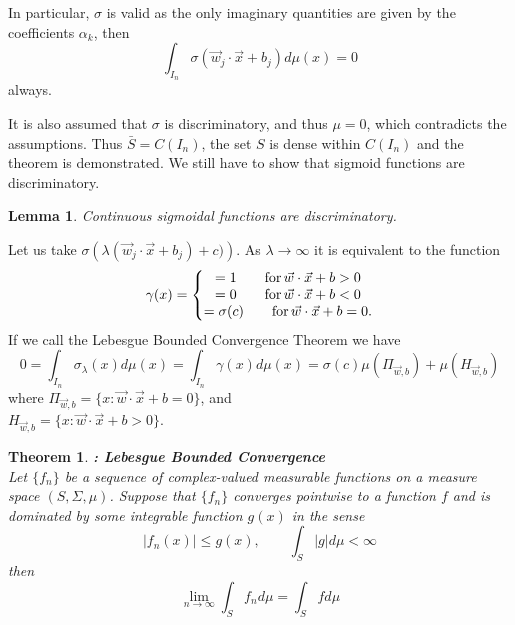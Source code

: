 \documentclass[aps,amssymb,amsmath,amsfonts,pra,superscriptaddress,twocolumn]{revtex4}
\newtheorem{theorem}{Theorem}
\newtheorem{lemma}{Lemma}
\begin{document}
In particular, $\sigma$ is valid as the only imaginary quantities are given by the coefficients $\alpha_k$, then
\begin{equation}
\int_{I_n} \sigma(\vec w_j \cdot \vec x + b_j) d\mu(x) = 0
\end{equation}
always. 

It is also assumed that $\sigma$ is discriminatory, and thus $\mu=0$, which contradicts the assumptions. Thus $\bar S = C(I_n)$, the set $S$ is dense within $C(I_n)$ and the theorem is demonstrated. We still have to show that sigmoid functions are discriminatory.

\begin{lemma}
Continuous sigmoidal functions are discriminatory.
\end{lemma}
Let us take $\sigma\left(\lambda(\vec w_j \cdot \vec x + b_j) + c)\right)$. As $\lambda \rightarrow \infty$ it is equivalent to the function
\begin{equation}
\gamma(x) = \left\lbrace \begin{matrix}
= 1 \qquad {\rm for \,} \vec w \cdot \vec x + b > 0 \\
= 0 \qquad {\rm for \,} \vec w \cdot \vec x + b < 0 \\
= \sigma(c) \qquad {\rm for \,} \vec w \cdot \vec x + b = 0. 
\end{matrix}\right.
\end{equation}
If we call the Lebesgue Bounded Convergence Theorem we have
\begin{equation}
0 = \int_{I_n} \sigma_\lambda(x) d\mu(x) = \int_{I_n} \gamma(x) d\mu(x) = \sigma(c) \mu(\Pi_{\vec w, b}) + \mu(H_{\vec w, b})
\end{equation}
where $\Pi_{\vec w, b} = \lbrace x : \vec w \cdot \vec x + b = 0\rbrace$, and \\$H_{\vec w, b} = \lbrace x : \vec w \cdot \vec x + b > 0\rbrace$. 

\begin{theorem}
{\bf: Lebesgue Bounded Convergence} \cite{analysis-weir1974}\\
Let $\lbrace f_n\rbrace$ be a sequence of complex-valued measurable functions on a measure space $(S, \Sigma, \mu)$. Suppose that $\lbrace f_n \rbrace$ converges pointwise to a function $f$ and is dominated by some integrable function $g(x)$ in the sense
\begin{equation}
|f_n(x)| \leq g(x), \qquad \int_S |g|d\mu < \infty
\end{equation}
then
\begin{equation}
\lim_{n\rightarrow \infty} \int_S f_n d\mu = \int_S f d\mu
\end{equation}
\end{theorem}
\end{document}
